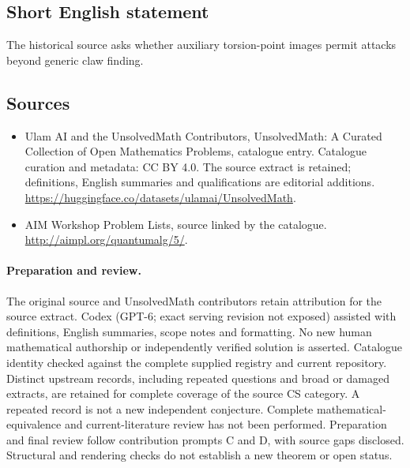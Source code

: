 \documentclass[11pt]{article}
\begin{document}
\subsection{Short English statement}
The historical source asks whether auxiliary torsion-point images permit attacks beyond generic claw finding.
\subsection{Sources}
\begin{itemize}
\item[\hypertarget{source:statement:1}{S1}] Ulam AI and the UnsolvedMath Contributors, UnsolvedMath: A Curated Collection of Open Mathematics Problems, catalogue entry. Catalogue curation and metadata: CC BY 4.0. The source extract is retained; definitions, English summaries and qualifications are editorial additions.
\url{https://huggingface.co/datasets/ulamai/UnsolvedMath}.
\item[\hypertarget{source:statement:2}{S2}] AIM Workshop Problem Lists, source linked by the catalogue.
\url{http://aimpl.org/quantumalg/5/}.
\end{itemize}
\paragraph{Preparation and review.}
The original source and UnsolvedMath contributors retain attribution for the source extract. Codex (GPT-6; exact serving revision not exposed) assisted with definitions, English summaries, scope notes and formatting. No new human mathematical authorship or independently verified solution is asserted. Catalogue identity checked against the complete supplied registry and current repository. Distinct upstream records, including repeated questions and broad or damaged extracts, are retained for complete coverage of the source CS category. A repeated record is not a new independent conjecture. Complete mathematical-equivalence and current-literature review has not been performed. Preparation and final review follow contribution prompts C and D, with source gaps disclosed. Structural and rendering checks do not establish a new theorem or open status.
\label{end:statement}
\end{document}
